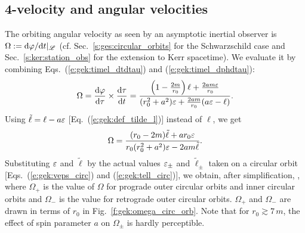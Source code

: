 \subsection{4-velocity and angular velocities} \label{s:gek:circ_velocities}

The orbiting angular velocity as seen by an asymptotic inertial observer is
$\Omega := \mathrm{d}\varphi/\mathrm{d} t |_{\mathscr{L}}$ (cf. Sec.~\ref{s:ges:circular_orbits} for the
Schwarzschild case and Sec.~\ref{s:ker:station_obs} for the extension to Kerr
spacetime).
We evaluate it by combining Eqs.~(\ref{e:gek:timel_dtdtau}) and (\ref{e:gek:timel_dphdtau}):
\[
    \Omega = \frac{\mathrm{d}\varphi}{\mathrm{d}\tau} \times \frac{\mathrm{d}\tau}{\mathrm{d} t}
        = \frac{ \left( 1 - \frac{2m}{r_0} \right) \ell
    + \frac{2 am \varepsilon}{r_0} }{(r_0^2 + a^2) \varepsilon + \frac{2 a m}{r_0} (a\varepsilon - \ell)} .
\]
Using $\tilde{\ell} = \ell - a\varepsilon$ [Eq.~(\ref{e:gek:def_tilde_l})] instead of $\ell$, we
get
\[
    \Omega = \frac{(r_0 - 2m) \tilde{\ell} + a r_0 \varepsilon}{r_0(r_0^2 + a^2) \varepsilon
    - 2 a m \tilde{\ell}} .
\]
Substituting $\varepsilon$ and $\tilde{\ell}$ by the actual values $\varepsilon_\pm$
and $\tilde{\ell}_\pm$ taken on a circular orbit [Eqs.~(\ref{e:gek:veps_circ})
and (\ref{e:gek:tell_circ})], we obtain, after simplification,
\be \label{e:gek:Omega_circ}
     ,
\ee
where $\Omega_+$ is the value of $\Omega$ for prograde outer circular orbits
and inner circular orbits and $\Omega_-$ is the value for retrograde
outer circular orbits. $\Omega_+$ and $\Omega_-$ are drawn in terms of $r_0$
in Fig.~\ref{f:gek:omega_circ_orb}. Note that for $r_0 \gtrsim 7\, m$,
the effect of spin parameter $a$ on $\Omega_\pm$ is hardly perceptible.


